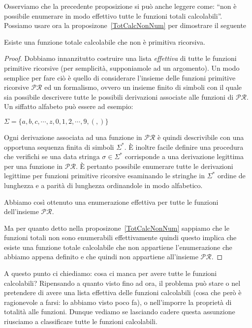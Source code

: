 Osserviamo che la precedente proposizione si pu\`o anche leggere come: ``non \`e
possibile enumerare in modo effettivo tutte le funzioni totali calcolabili''.\\

Possiamo usare ora la proposizone~\ref{TotCalcNonNum} per dimostrare il seguente

\begin{teorema}\label{diagRic} Esiste una funzione totale calcolabile che non
\`e primitiva ricorsiva.
\end{teorema}

\begin{proof} Dobbiamo innanzitutto costruire una lista \emph{effettiva} di
tutte le funzioni primitive ricorsive (per semplicit\`a, supponiamole ad un
argomento). 
Un modo semplice per fare ci\`o \`e quello di considerare l'insieme delle
funzioni primitive ricorsive $\mathcal{PR}$ ed un formalismo, ovvero un insieme
finito di simboli con il quale sia possibile descrivere tutte le possibili
derivazioni associate alle funzioni di $\mathcal{PR}$. Un siffatto alfabeto
pu\`o essere ad esempio:
\begin{center}
$\Sigma = \lbrace a, b, c, \cdots ,z , 0, 1, 2, \cdots , 9, (, ) \rbrace$
\end{center}
Ogni derivazione associata ad una funzione in $\mathcal{PR}$ \`e quindi
descrivibile con una opportuna sequenza finita di simboli $\Sigma^{*}$. \`E
inoltre facile definire una procedura che verifichi se una data stringa $\sigma
\in \Sigma^{*}$ corrisponde a una derivazione legittima per una funzione in
$\mathcal{PR}$. \`E pertanto possibile enumerare tutte le derivazioni legittime
per funzioni primitive ricorsive esaminando le stringhe in $\Sigma^{*}$ ordine
de lunghezza e a parit\`a di lunghezza ordinandole in modo alfabetico.

Abbiamo cos\`i ottenuto una enumerazione effettiva per tutte le funzioni
dell'insieme $\mathcal{PR}$.

Ma per quanto detto nella proposizone~\ref{TotCalcNonNum} sappiamo che le
funzioni totali non sono enumerabili effettivamente quindi questo implica che
esiste una funzione totale calcolabile che non appartiene l'enumerazione che
abbiamo appena definito e che quindi non appartiene all'insieme $\mathcal{PR}$.
\end{proof}

A questo punto ci chiediamo: cosa ci manca per avere tutte le funzioni
calcolabili?
Ripensando a quanto visto fino ad ora, il problema pu\`o stare o nel pretendere
di avere una lista effettiva delle funzioni calcolabili (cosa che per\`o \`e
ragionevole a farsi: lo abbiamo visto poco fa), o nell'imporre la propriet\`a di
totalit\`a alle funzioni. Dunque vediamo se lasciando cadere questa assunzione
riusciamo a classificare tutte le funzioni calcolabili.


